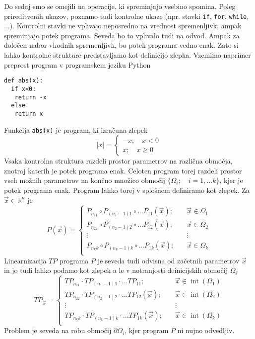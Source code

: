 \documentclass{article}
\newcommand{\RR}{\mathbb{R}}
\DeclareMathOperator{\interior}{int}
\begin{document}
Do sedaj smo se omejili na operacije, ki spreminjajo vsebino spomina. Poleg
prireditvenih ukazov, poznamo tudi kontrolne ukaze (npr. stavki \texttt{if},
\texttt{for}, \texttt{while}, ...). Kontrolni stavki ne vplivajo neposredno na
vrednost spremenljivk, ampak spreminjajo potek programa. Seveda bo to vplivalo
tudi na odvod. Ampak za določen nabor vhodnih spremenljivk, bo potek programa
vedno enak. Zato si lahko kontrolne strukture predstavljamo kot definicijo
zlepka. Vzemimo naprimer preprost program v programskem jeziku Python
\begin{verbatim}
def abs(x):
  if x<0:
   return -x
  else
   return x
\end{verbatim}
Funkcija \texttt{abs(x)} je program, ki izračuna zlepek
\begin{equation}
  \label{eq:zlepek}
  |x| =
  \begin{cases}
    -x;\quad x<0\\
    x;\quad x\ge 0
  \end{cases}
\end{equation}
Vsaka kontrolna struktura razdeli prostor parametrov na različna območja,
znotraj katerih je potek programa enak. Celoten program torej razdeli prostor
vseh možnih parametrov na končno množico območij $\{\Omega_i;\quad i=1,\ldots
k\}$, kjer je potek programa enak. Program lahko torej v splošnem definiramo kot
zlepek. Za $\vec{x}\in\RR^n$ je
\begin{equation}
  \label{eq:zlrprk_splosno}
  P(\vec{x}) =
  \begin{cases}
    P_{n_11}\circ P_{(n_1-1)1}\circ\ldots P_{11}(\vec{x});&\quad \vec{x}\in\Omega_1\\
    P_{n_22}\circ P_{(n_2-1)2}\circ\ldots P_{12}(\vec{x});&\quad \vec{x}\in\Omega_2\\
    \vdots&\quad\vdots\\
    P_{n_kk}\circ P_{(n_k-1)k}\circ\ldots P_{1k}(\vec{x});&\quad \vec{x}\in\Omega_k\\
  \end{cases}
\end{equation}
Linearnizacija $TP$ programa $P$ je seveda tudi odvisna od začetnih parametrov
$\vec{x}$ in jo tudi lahko podamo kot zlepek a le v notranjosti deinicijskih območij $\Omega_i$
\begin{equation}
  \label{eq:zlrprk_splosno}
  TP_{\vec{x}} =
  \begin{cases}
    TP_{n_11}\cdot TP_{(n_1-1)1}\cdot\ldots TP_{11};&\quad \vec{x}\in\interior(\Omega_1)\\
    TP_{n_22}\cdot TP_{(n_2-1)2}\cdot\ldots TP_{12}(\vec{x});&\quad \vec{x}\in\interior(\Omega_2)\\
    \vdots&\quad\vdots\\
    TP_{n_kk}\cdot TP_{(n_k-1)k}\cdot\ldots TP_{1k}(\vec{x});&\quad \vec{x}\in\interior(\Omega_k)\\
  \end{cases}
\end{equation}
Problem je seveda na robu območij $\partial\Omega_i$, kjer program $P$ ni nujno odvedljiv.
\end{document}

